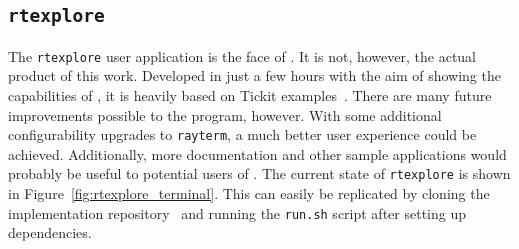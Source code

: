 \subsection{\texttt{rtexplore}}\label{ch:implementation:final:rtexplore}

The \texttt{rtexplore} user application is the face of \name{}.
It is not, however, the actual product of this work.
Developed in just a few hours with the aim of showing the capabilities of \name{}, it is heavily based on Tickit examples~\cite{libtickitLibrary}.
There are many future improvements possible to the program, however.
With some additional configurability upgrades to \texttt{rayterm}, a much better user experience could be achieved.
Additionally, more documentation and other sample applications would probably be useful to potential users of \name{}.
The current state of \texttt{rtexplore} is shown in Figure~\ref{fig:rtexplore_terminal}.
This can easily be replicated by cloning the \name{} implementation repository~\cite{raytermGpuImpl} and running the \texttt{run.sh} script after setting up dependencies.
